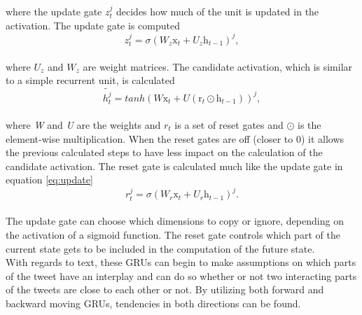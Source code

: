 where the update gate $z_{t}^{j}$ decides how much of the unit is updated in the activation. The update gate is computed\\

\begin{equation}\label{eq:update}
z_{t}^{j}=\sigma\left(W_{z}\mathrm{x}_{t}+U_{z}\mathrm{h}_{t-1}\right)^{j},
\end{equation}\\

where $U_{z}$ and $W_{z}$ are weight matrices. The candidate activation, which is similar to a simple recurrent unit, is calculated\\

\begin{equation} \label{eq:candidate}
\tilde{h_{t}^{j}} = tanh\left(W\mathrm{x}_{t}+U\left(\mathrm{r}_{t}\odot\mathrm{h}_{t-1}\right)\right)^{j},
\end{equation}\\

where \textit{W} and \textit{U} are the weights and $r_{t}$ is a set of reset gates and $\odot$ is the element-wise multiplication. When the reset gates are off (closer to 0) it allows the previous calculated steps to have less impact on the calculation of the candidate activation. The reset gate is calculated much like the update gate in equation \ref{eq:update}\\

\begin{equation}\label{eq:reset}
r_{t}^{j}=\sigma\left(W_{r}\mathrm{x}_{t}+U_{r}\mathrm{h}_{t-1}\right)^{j}.
\end{equation}\\

The update gate can choose which dimensions to copy or ignore, depending on the activation of a sigmoid function. The reset gate controls which part of the current state gets to be included in the computation of the future state.\\
With regards to text, these GRUs can begin to make assumptions on which parts of the tweet have an interplay and can do so whether or not two interacting parts of the tweets are close to each other or not. By utilizing both forward and backward moving GRUs, tendencies in both directions can be found.

